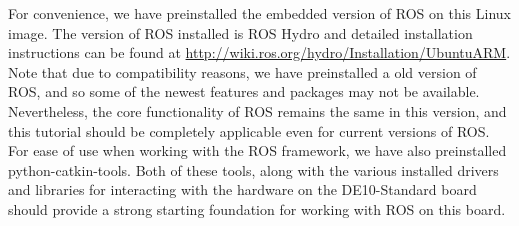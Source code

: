 \documentclass[11pt, twoside, pdftex]{article}
\begin{document}
For convenience, we have preinstalled the embedded version of ROS on this Linux image. The version of ROS installed is ROS Hydro and detailed installation instructions can be found at \url{http://wiki.ros.org/hydro/Installation/UbuntuARM}. Note that due to compatibility reasons, we have preinstalled a old version of ROS, and so some of the newest features and packages may not be available. Nevertheless, the core functionality of ROS remains the same in this version, and this tutorial should be completely applicable even for current versions of ROS. For ease of use when working with the ROS framework, we have also preinstalled python-catkin-tools. Both of these tools, along with the various installed drivers and libraries for interacting with the hardware on the DE10-Standard board should provide a strong starting foundation for working with ROS on this board.

\newpage
\end{document}
